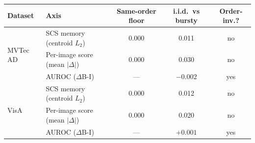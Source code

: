 \begin{tabular}{llccc}
\toprule
Dataset & Axis & Same-order floor & i.i.d.\ vs bursty & Order-inv.? \\
\midrule
\multirow{3}{*}{MVTec AD} & SCS memory (centroid $L_2$) & 0.000 & 0.011 & no \\
 & Per-image score (mean $|\Delta|$) & 0.000 & 0.030 & no \\
 & AUROC ($\Delta$B-I) & --- & $-0.002$ & yes \\
\midrule
\multirow{3}{*}{VisA} & SCS memory (centroid $L_2$) & 0.000 & 0.012 & no \\
 & Per-image score (mean $|\Delta|$) & 0.000 & 0.020 & no \\
 & AUROC ($\Delta$B-I) & --- & $+0.001$ & yes \\
\bottomrule
\end{tabular}
